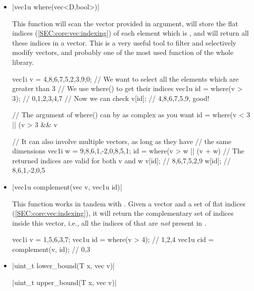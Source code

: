 \documentclass[12pt]{report}
\newenvironment{example}
{
    \begin{mdframed}[style=example,frametitle={Example}]
}
{
    \end{mdframed}
}
\begin{document}
\begin{itemize}
\item \cppinline|vec1u where(vec<D,bool>)| 

This function will scan the  vector provided in argument, will store the flat indices (\ref{SEC:core:vec:indexing}) of each element which is , and will return all these indices in a vector. This is a very useful tool to filter and selectively modify vectors, and probably one of the most used function of the whole library.

\begin{example}
\begin{cppcode}
vec1i v = {4,8,6,7,5,2,3,9,0};
// We want to select all the elements which are greater than 3
// We use where() to get their indices
vec1u id = where(v > 3); // {0,1,2,3,4,7}
// Now we can check
v[id]; // {4,8,6,7,5,9}, good!

// The argument of where() can by as complex as you want
id = where(v < 3 || (v > 3 && v %

// It can also involve multiple vectors, as long as they have
// the same dimensions
vec1i w = {9,8,6,1,-2,0,8,5,1};
id = where(v > w || (v + w) %
// The returned indices are valid for both v and w
v[id]; // {8,6,7,5,2,9}
w[id]; // {8,6,1,-2,0,5}
\end{cppcode}
\end{example}

\item \cppinline|vec1u complement(vec v, vec1u id)| 

This function works in tandem with . Given a vector  and a set of flat indices  (\ref{SEC:core:vec:indexing}), it will return the complementary set of indices inside this vector, i.e., all the indices of  that are \emph{not} present in .

\begin{example}
\begin{cppcode}
vec1i v = {1,5,6,3,7};
vec1u id = where(v > 4); // {1,2,4}
vec1u cid = complement(v, id); // {0,3}
\end{cppcode}
\end{example}

\item \cppinline|uint_t lower_bound(T x, vec v)| 

\cppinline|uint_t upper_bound(T x, vec v)| 


\end{itemize}
\end{document}

